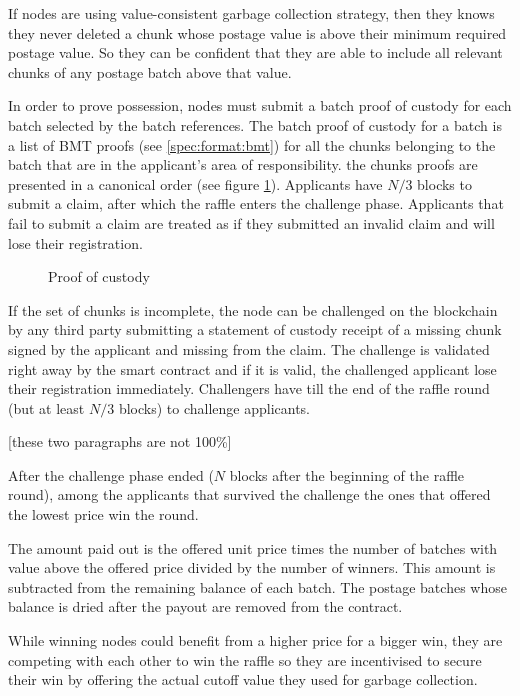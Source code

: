 If nodes are using value-consistent garbage collection strategy, then they knows they never deleted a chunk whose postage value is above their minimum required postage value. So they can be confident that they are able to include all relevant chunks of any postage batch above that value.

In order to prove possession, nodes must submit a batch proof of custody for each batch selected by the batch references. The batch proof of custody for a batch is a list of BMT proofs (see \ref{spec:format:bmt}) for all the chunks belonging to the batch that are in the applicant's area of responsibility. the chunks proofs are presented in a canonical order (see figure \ref{fig:batch-proof-of-custody}). Applicants have $N/3$ blocks to submit a claim, after which the raffle enters the challenge phase. Applicants that fail to submit a claim are treated as if they submitted an invalid claim and will lose their registration.


\begin{figure}[htbp]
  \centering
  \caption{Proof of custody}
  \label{fig:batch-proof-of-custody}
\end{figure}

If the set of chunks is incomplete, the node can be challenged on the blockchain by any third party submitting a statement of custody receipt of a missing chunk signed by the applicant and missing from the claim. The challenge is validated right away by the smart contract and if it is valid, the challenged applicant lose their registration immediately. Challengers have till the end of the raffle round (but at least $N/3$ blocks) to challenge applicants.


[these two paragraphs are not 100\%]

After the challenge phase ended ($N$ blocks after the beginning of the raffle round), among the applicants that survived the challenge the ones that offered the lowest price win the round. 

The amount paid out is the offered unit price times the number of batches with value above the offered price divided by the number of winners. This amount is subtracted from the remaining balance of each batch.  The postage batches whose balance is dried after the payout are removed from the contract.

While winning nodes could benefit from a higher price for a bigger win, they are competing with each other to win the raffle so they are incentivised to secure their win by offering the actual cutoff value they used for garbage collection.


